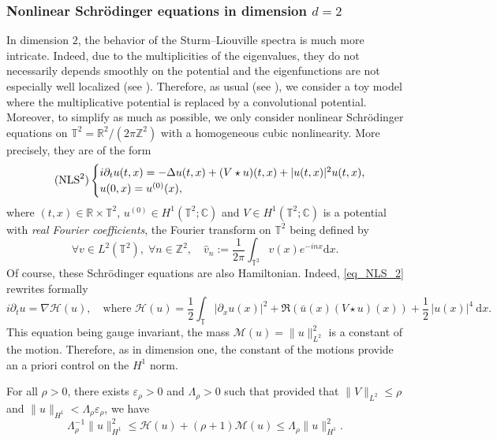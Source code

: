 \subsubsection{Nonlinear Schrödinger equations in dimension $d=2$}
\label{sub_sec_NLS2}
In dimension $2$, the behavior of the Sturm--Liouville spectra is much more intricate. Indeed, due to the multiplicities of the eigenvalues, they do not necessarily depends smoothly on the potential and the eigenfunctions are not especially well localized (see \eg \cite{BB13}). Therefore, as usual (see \eg \cite{BG06,FI19,BMP20}), we consider a toy model where the multiplicative potential is replaced by a convolutional potential. Moreover, to simplify as much as possible, we only consider nonlinear Schrödinger equations on $\mathbb{T}^2 = \mathbb{R}^2 / (2\pi \mathbb{Z}^2)$ with a homogeneous cubic nonlinearity. More precisely, they are of the form
\begin{equation}
\label{eq_NLS_2}
\tag{$\mathrm{NLS}^2$}
\begin{cases}
i\partial_t u(t,x) = -\Delta u(t,x) +(V \star u)(t,x) + |u(t,x)|^2 u(t,x), \\
u(0,x) = u^{(0)}(x),
\end{cases}
\end{equation}
where $(t,x)\in \mathbb{R}\times\mathbb{T}^2$, $u^{(0)}\in H^1(\mathbb{T}^2;\mathbb{C})$ and $V \in H^1(\mathbb{T}^2 ; \mathbb{C})$ is a potential with \emph{real Fourier coefficients}, the Fourier transform on $\mathbb{T}^2$ being defined by
\[
\forall v\in L^2(\mathbb{T}^2),\;\forall n \in \mathbb{Z}^2, \quad \widehat{v}_n:= \frac1{2\pi} \int_{\mathbb{T}^2} v(x) e^{-inx}\mathrm{d}x.
\]
Of course, these Schrödinger equations are also Hamiltonian. Indeed, \eqref{eq_NLS_2} rewrites formally
\[
i\partial_t u = \nabla \mathcal{H}(u), \quad \text{where } \mathcal{H}(u) =\frac12 \int_{\mathbb{T}} |\partial_x u(x) |^2 + \Re (\bar{u}(x)(V \star u)(x)) + \frac12\, |u(x)|^4 \ \mathrm{d}x.
\]
This equation being gauge invariant, the mass $\mathcal{M}(u) = \|u\|_{L^2}^2$ is a constant of the motion. Therefore, as in dimension one, the constant of the motions provide an a priori control on the $H^1$ norm.
\begin{lemma} \label{lemma_Lag_NLS_coer_2d} For all $\rho>0$, there exists $\varepsilon_\rho >0$ and $\Lambda_\rho>0$ such that provided that $\| V \|_{L^2} \leq \rho$ and $\|u\|_{H^1} < \Lambda_\rho \varepsilon_\rho$, we have
\[
\Lambda_{\rho}^{-1} \| u\|_{H^1}^2 \leq \mathcal{H}(u) + (\rho+1) \mathcal{M}(u) \leq \Lambda_{\rho} \| u\|_{H^1}^2.
\]
\end{lemma}
